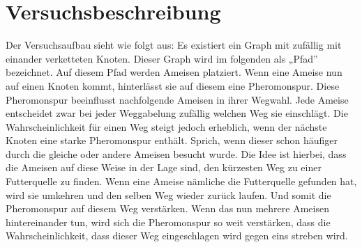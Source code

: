 
\section{Versuchsbeschreibung}

Der Versuchsaufbau sieht wie folgt aus: Es existiert ein Graph mit
zufällig mit einander verketteten Knoten. Dieser Graph wird im
folgenden als „Pfad” bezeichnet. Auf diesem Pfad werden Ameisen
platziert. Wenn eine Ameise nun auf einen Knoten kommt, hinterlässt
sie auf diesem eine Pheromonspur. Diese Pheromonspur beeinflusst
nachfolgende Ameisen in ihrer Wegwahl. Jede Ameise entscheidet zwar
bei jeder Weggabelung zufällig welchen Weg sie einschlägt. Die
Wahrscheinlichkeit für einen Weg steigt jedoch erheblich, wenn der
nächste Knoten eine starke Pheromonspur enthält. Sprich, wenn dieser
schon häufiger durch die gleiche oder andere Ameisen besucht wurde.
Die Idee ist hierbei, dass die Ameisen auf diese Weise in der Lage
sind, den kürzesten Weg zu einer Futterquelle zu finden. Wenn eine
Ameise nämliche die Futterquelle gefunden hat, wird sie umkehren und
den selben Weg wieder zurück laufen. Und somit die Pheromonspur auf
diesem Weg verstärken. Wenn das nun mehrere Ameisen hintereinander
tun, wird sich die Pheromonspur so weit verstärken, dass die
Wahrscheinlichkeit, dass dieser Weg eingeschlagen wird gegen eins
streben wird.

